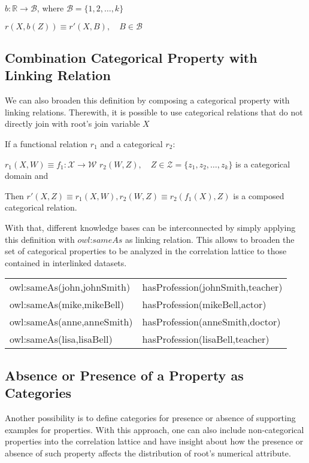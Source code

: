 $b: \mathbb{R} \rightarrow \mathcal{B}$, where $\mathcal{B}=\{1,2,\dots ,k \}$

$r(X,b(Z)) \equiv r'(X,B) , \quad B \in \mathcal{B}$

\subsection{Combination Categorical Property with Linking Relation}
We can also broaden this definition by composing a categorical property with linking relations. Therewith, it is
possible to use categorical relations that do not directly join with root's join variable $X$

If a functional relation $r_1$ and a categorical $r_2$:

$r_1(X,W) \equiv f_1 : \mathcal{X} \rightarrow \mathcal{W}$ \newline
$r_2(W,Z),\quad Z \in \mathcal{Z}=\{z_1,z_2,\ldots,z_k\}$ is a categorical domain and 

Then $r'(X,Z) \equiv r_1(X,W),r_2(W,Z) \equiv r_2(f_1(X),Z)$ is a composed categorical relation. 

With that, different knowledge bases can be interconnected by simply applying this definition with $owl$:$sameAs$
as linking relation. This allows to broaden the set of categorical properties to be analyzed in the correlation lattice
to those
contained in interlinked datasets.

\begin{tabular}{*{2}{l}}
\label{tb:cat1}
  owl:sameAs(john,johnSmith)& hasProfession(johnSmith,teacher) 	 \\
  owl:sameAs(mike,mikeBell) & hasProfession(mikeBell,actor) 	 \\
  owl:sameAs(anne,anneSmith)& hasProfession(anneSmith,doctor)	 \\
  owl:sameAs(lisa,lisaBell) & hasProfession(lisaBell,teacher) 
\end{tabular}

\subsection{Absence or Presence of a Property as Categories}

Another possibility is to define categories for presence or absence of supporting examples for properties. With this
approach, one can also include non-categorical properties into the correlation lattice and have insight about how the
presence or absence of such property affects the distribution of root's numerical attribute.

